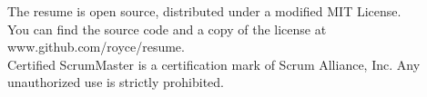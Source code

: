 \documentclass[margin]{res}
\begin{document}
\vfill
\centering


\footnotesize
\hspace{-1.75in}  The resume is open source, distributed under a
                  modified MIT License. \\
\hspace{-1.75in}  You can find the source code and a copy of the license
                  at www.github.com/royce/resume.\\
\hspace{-1.75in}  Certified ScrumMaster is a certification mark of
                  Scrum Alliance, Inc. Any unauthorized use is strictly prohibited.
\vfill
\end{document}
